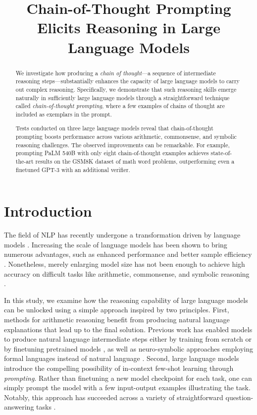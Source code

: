 \title{Chain-of-Thought Prompting Elicits Reasoning in Large Language Models}

\begin{abstract}
We investigate how producing a \textit{chain of thought}—a sequence of intermediate reasoning steps—substantially enhances the capacity of large language models to carry out complex reasoning. Specifically, we demonstrate that such reasoning skills emerge naturally in sufficiently large language models through a straightforward technique called \textit{chain-of-thought prompting}, where a few examples of chains of thought are included as exemplars in the prompt.

Tests conducted on three large language models reveal that chain-of-thought prompting boosts performance across various arithmetic, commonsense, and symbolic reasoning challenges. The observed improvements can be remarkable. For example, prompting PaLM 540B with only eight chain-of-thought examples achieves state-of-the-art results on the GSM8K dataset of math word problems, outperforming even a finetuned GPT-3 with an additional verifier.
\end{abstract}

\section{Introduction}
The field of NLP has recently undergone a transformation driven by language models \citep[][\textit{inter alia}]{peters-etal-2018-deep,devlin-etal-2019-bert,brown2020language}. Increasing the scale of language models has been shown to bring numerous advantages, such as enhanced performance and better sample efficiency \citep[\textit{inter alia}]{kaplan2020scaling,brown2020language}. Nonetheless, merely enlarging model size has not been enough to achieve high accuracy on difficult tasks like arithmetic, commonsense, and symbolic reasoning \citep{rae2021scaling}.

In this study, we examine how the reasoning capability of large language models can be unlocked using a simple approach inspired by two principles. First, methods for arithmetic reasoning benefit from producing natural language explanations that lead up to the final solution. Previous work has enabled models to produce natural language intermediate steps either by training from scratch \citep{ling-etal-2017-program} or by finetuning pretrained models \citep{cobbe2021training}, as well as neuro-symbolic approaches employing formal languages instead of natural language \citep{roy-roth-2015-solving, chiang-chen-2019-semantically,amini-etal-2019-mathqa, chen2019neural}. Second, large language models introduce the compelling possibility of in-context few-shot learning through \emph{prompting}. Rather than finetuning a new model checkpoint for each task, one can simply prompt the model with a few input-output examples illustrating the task. Notably, this approach has succeeded across a variety of straightforward question-answering tasks \citep{brown2020language}.

